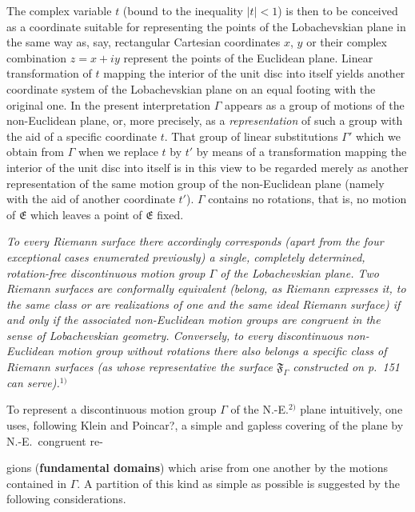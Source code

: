 \documentclass{article}
\begin{document}
The complex variable $t$ (bound to the inequality $|t| < 1$) is then to be conceived as a coordinate suitable for representing the points of the Lobachevskian plane in the same way as, say, rectangular Cartesian coordinates $x$, $y$ or their complex combination $z = x + iy$ represent the points of the Euclidean plane. Linear transformation of $t$ mapping the interior of the unit disc into itself yields another coordinate system of the Lobachevskian plane on an equal footing with the original one. In the present interpretation $\varGamma$ appears as a group of motions of the non-Euclidean plane, or, more precisely, as a \emph{representation} of such a group with the aid of a specific coordinate $t$. That group of linear substitutions $\varGamma'$ which we obtain from $\varGamma$ when we replace $t$ by $t'$ by means of a transformation mapping the interior of the unit disc into itself is in this view to be regarded merely as another representation of the same motion group of the non-Euclidean plane (namely with the aid of another coordinate $t'$). $\varGamma$ contains no rotations, that is, no motion of $\mathfrak{E}$ which leaves a point of $\mathfrak{E}$ fixed.

\emph{To every Riemann surface there accordingly corresponds (apart from the four exceptional cases enumerated previously) a single, completely determined, rotation-free discontinuous motion group $\varGamma$ of the Lobachevskian plane. Two Riemann surfaces are conformally equivalent (belong, as Riemann expresses it, to the same class or are realizations of one and the same ideal Riemann surface) if and only if the associated non-Euclidean motion groups are congruent in the sense of Lobachevskian geometry. Conversely, to every discontinuous non-Euclidean motion group without rotations there also belongs a specific class of Riemann surfaces (as whose representative the surface $\mathfrak{F}_\varGamma$ constructed on p.~151 can serve).}${}^{1)}$

To represent a discontinuous motion group $\varGamma$ of the N.-E.${}^{2)}$ plane intuitively, one uses, following Klein and Poincar?, a simple and gapless covering of the plane by N.-E.\ congruent re-

gions (\textbf{fundamental domains}) which arise from one another by the motions contained in $\varGamma$. A partition of this kind as simple as possible is suggested by the following considerations.

\end{document}
